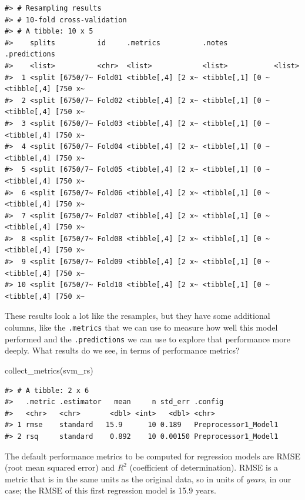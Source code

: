 \documentclass[
]{krantz}
\makeatletter
\newenvironment{Shaded}{\begin{snugshade}}{\end{snugshade}}
\newcommand{\FunctionTok}[1]{\textcolor[rgb]{0.00,0.00,0.00}{#1}}
\newcommand{\NormalTok}[1]{#1}
\newenvironment{kframe}{%
\medskip{}
\setlength{\fboxsep}{.8em}
 \def\at@end@of@kframe{}%
 \ifinner\ifhmode%
  \def\at@end@of@kframe{\end{minipage}}%
  \begin{minipage}{\columnwidth}%
 \fi\fi%
 \def\FrameCommand##1{\hskip\@totalleftmargin \hskip-\fboxsep
 \colorbox{shadecolor}{##1}\hskip-\fboxsep
     \hskip-\linewidth \hskip-\@totalleftmargin \hskip\columnwidth}%
 \MakeFramed {\advance\hsize-\width
   \@totalleftmargin\z@ \linewidth\hsize
   \@setminipage}}%
 {\par\unskip\endMakeFramed%
 \at@end@of@kframe}
\renewenvironment{Shaded}{\begin{kframe}}{\end{kframe}}
\makeatother
\begin{document}
\begin{verbatim}
#> # Resampling results
#> # 10-fold cross-validation 
#> # A tibble: 10 x 5
#>    splits          id     .metrics          .notes           .predictions       
#>    <list>          <chr>  <list>            <list>           <list>             
#>  1 <split [6750/7~ Fold01 <tibble[,4] [2 x~ <tibble[,1] [0 ~ <tibble[,4] [750 x~
#>  2 <split [6750/7~ Fold02 <tibble[,4] [2 x~ <tibble[,1] [0 ~ <tibble[,4] [750 x~
#>  3 <split [6750/7~ Fold03 <tibble[,4] [2 x~ <tibble[,1] [0 ~ <tibble[,4] [750 x~
#>  4 <split [6750/7~ Fold04 <tibble[,4] [2 x~ <tibble[,1] [0 ~ <tibble[,4] [750 x~
#>  5 <split [6750/7~ Fold05 <tibble[,4] [2 x~ <tibble[,1] [0 ~ <tibble[,4] [750 x~
#>  6 <split [6750/7~ Fold06 <tibble[,4] [2 x~ <tibble[,1] [0 ~ <tibble[,4] [750 x~
#>  7 <split [6750/7~ Fold07 <tibble[,4] [2 x~ <tibble[,1] [0 ~ <tibble[,4] [750 x~
#>  8 <split [6750/7~ Fold08 <tibble[,4] [2 x~ <tibble[,1] [0 ~ <tibble[,4] [750 x~
#>  9 <split [6750/7~ Fold09 <tibble[,4] [2 x~ <tibble[,1] [0 ~ <tibble[,4] [750 x~
#> 10 <split [6750/7~ Fold10 <tibble[,4] [2 x~ <tibble[,1] [0 ~ <tibble[,4] [750 x~
\end{verbatim}

These results look a lot like the resamples, but they have some additional columns, like the \texttt{.metrics} that we can use to measure how well this model performed and the \texttt{.predictions} we can use to explore that performance more deeply. What results do we see, in terms of performance metrics?

\begin{Shaded}
\begin{Highlighting}[]
\FunctionTok{collect\_metrics}\NormalTok{(svm\_rs)}
\end{Highlighting}
\end{Shaded}

\begin{verbatim}
#> # A tibble: 2 x 6
#>   .metric .estimator   mean     n std_err .config             
#>   <chr>   <chr>       <dbl> <int>   <dbl> <chr>               
#> 1 rmse    standard   15.9      10 0.189   Preprocessor1_Model1
#> 2 rsq     standard    0.892    10 0.00150 Preprocessor1_Model1
\end{verbatim}

The default performance metrics to be computed for regression models are RMSE (root mean squared error) and \(R^2\) (coefficient of determination). RMSE is a metric that is in the same units as the original data, so in units of \emph{years}, in our case; the RMSE of this first regression model is 15.9 years.
\end{document}
